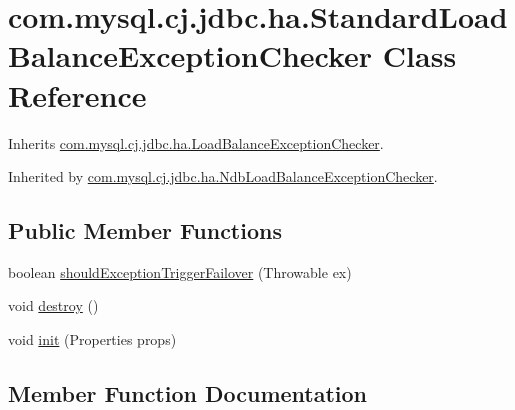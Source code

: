 \hypertarget{classcom_1_1mysql_1_1cj_1_1jdbc_1_1ha_1_1_standard_load_balance_exception_checker}{}\section{com.\+mysql.\+cj.\+jdbc.\+ha.\+Standard\+Load\+Balance\+Exception\+Checker Class Reference}
\label{classcom_1_1mysql_1_1cj_1_1jdbc_1_1ha_1_1_standard_load_balance_exception_checker}


Inherits \mbox{\hyperlink{interfacecom_1_1mysql_1_1cj_1_1jdbc_1_1ha_1_1_load_balance_exception_checker}{com.\+mysql.\+cj.\+jdbc.\+ha.\+Load\+Balance\+Exception\+Checker}}.



Inherited by \mbox{\hyperlink{classcom_1_1mysql_1_1cj_1_1jdbc_1_1ha_1_1_ndb_load_balance_exception_checker}{com.\+mysql.\+cj.\+jdbc.\+ha.\+Ndb\+Load\+Balance\+Exception\+Checker}}.

\subsection*{Public Member Functions}
\begin{DoxyCompactItemize}
\item 
boolean \mbox{\hyperlink{classcom_1_1mysql_1_1cj_1_1jdbc_1_1ha_1_1_standard_load_balance_exception_checker_a24152ea8a4fd653b8597301b47c9624f}{should\+Exception\+Trigger\+Failover}} (Throwable ex)
\item 
void \mbox{\hyperlink{classcom_1_1mysql_1_1cj_1_1jdbc_1_1ha_1_1_standard_load_balance_exception_checker_aaa6fc4e1cc5b3c781bc9ce11b9b76269}{destroy}} ()
\item 
void \mbox{\hyperlink{classcom_1_1mysql_1_1cj_1_1jdbc_1_1ha_1_1_standard_load_balance_exception_checker_af2f4516746c3615d1a4f3a191805b374}{init}} (Properties props)
\end{DoxyCompactItemize}


\subsection{Member Function Documentation}
\mbox{\label{classcom_1_1mysql_1_1cj_1_1jdbc_1_1ha_1_1_standard_load_balance_exception_checker_aaa6fc4e1cc5b3c781bc9ce11b9b76269}} 
